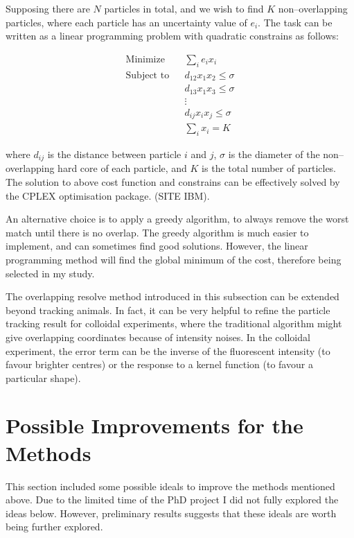 \documentclass[11pt,twoside]{report}
\begin{document}
Supposing there are $N$ particles in total, and we wish to find $K$ non--overlapping particles, where each particle has an uncertainty value of $e_i$. The task can be written as a linear programming problem with quadratic constrains as follows:

\begin{equation}
\begin{aligned}
	\textrm{Minimize} && \sum_i{e_i x_i} \\
	\textrm{Subject to} && d_{12} x_1 x_2 \le \sigma \\
	&& d_{13} x_1 x_3 \le \sigma \\
	&& \vdots  \\
	&& d_{ij} x_i x_j \le \sigma \\
	&& \sum_i{x_i} = K
\end{aligned}
\end{equation}

\noindent where $d_{ij}$ is the distance between particle $i$ and $j$, $\sigma$ is the diameter of the non--overlapping hard core of each particle, and $K$ is the total number of particles. The solution to above cost function and constrains can be effectively solved by the CPLEX optimisation package. (SITE IBM).

An alternative choice is to apply a greedy algorithm, to always remove the worst match until there is no overlap. The greedy algorithm is much easier to implement, and can sometimes find good solutions. However, the linear programming method will find the global minimum of the cost, therefore being selected in my study.

The overlapping resolve method introduced in this subsection can be extended beyond tracking animals. In fact, it can be very helpful to refine the particle tracking result for colloidal experiments, where the traditional algorithm might give overlapping coordinates because of intensity noises. In the colloidal experiment, the error term can be the inverse of the fluorescent intensity (to favour brighter centres) or the response to a kernel function (to favour a particular shape).

\section{Possible Improvements for the Methods}

This section included some possible ideals to improve the methods mentioned above. Due to the limited time of the PhD project I did not fully explored the ideas below. However, preliminary results suggests that these ideals are worth being further explored.
\end{document}
